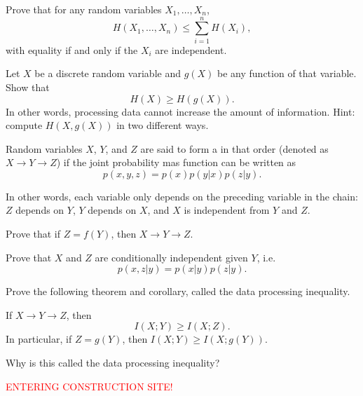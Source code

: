 \documentclass[a4paper, 11pt, openany]{book}
\begin{document}
\begin{exercise}
Prove that for any random variables $X_1,\ldots,X_n$,
$$
	H(X_1,\ldots,X_n) \le \sum_{i=1}^n H(X_i),
$$
with equality if and only if the $X_i$ are independent.
\end{exercise}



\begin{exercise}
Let $X$ be a discrete random variable and $g(X)$ be any function of that variable. Show that
$$
	H(X) \ge H(g(X)).
$$
In other words, processing data cannot increase the amount of information.
Hint: compute $H(X,g(X))$ in two different ways.
\end{exercise}



Random variables $X$, $Y$, and $Z$ are said to form a  in that order (denoted as $X \to Y \to Z$) if the joint probability mas function can be written as
$$
	p(x,y,z) = p(x) p(y|x) p(z | y).
$$

In other words, each variable only depends on the preceding variable in the chain: $Z$ depends on $Y$, $Y$ depends on $X$, and $X$ is independent from $Y$ and $Z$.

\begin{exercise}
Prove that if $Z = f(Y)$, then $X \to Y \to Z$.
\end{exercise}


\begin{exercise}
Prove that $X$ and $Z$ are conditionally independent given $Y$, i.e.
$$
	p(x,z|y) = p(x|y) p(z|y).
$$
\end{exercise}








\begin{exercise}
Prove the following theorem and corollary, called the data processing inequality.

If $X \to Y \to Z$, then
\[
	I(X;Y) \ge I(X;Z).
\]
In particular, if $Z = g(Y)$, then $I(X;Y) \ge I(X;g(Y))$.

Why is this called the data processing inequality?
\end{exercise}

\begin{center}
    \Huge{\textcolor{red}{ ENTERING CONSTRUCTION SITE! }}
    \end{center}
\end{document}

